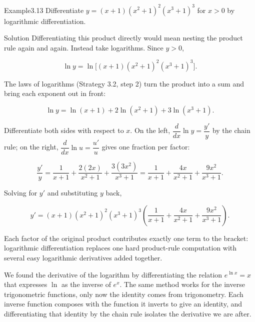 \documentclass[a4paper,12pt,oneside]{memoir}
\begin{document}
\begin{workedexample}
\begin{envexample}{Example}{3.13}{}
Differentiate \(y = (x + 1)(x^{2} + 1)^{2}(x^{3} + 1)^{3}\) for \(x > 0\) by logarithmic differentiation.
\end{envexample}
\begin{envsolution}{Solution}{}{}
Differentiating this product directly would mean nesting the product rule again and again. Instead take logarithms. Since \(y > 0\),

\[ \ln y = \ln\!\bigl[(x + 1)(x^{2} + 1)^{2}(x^{3} + 1)^{3}\bigr]. \]

The laws of logarithms (Strategy 3.2, step 2) turn the product into a sum and bring each exponent out in front:

\[ \ln y = \ln(x + 1) + 2\ln(x^{2} + 1) + 3\ln(x^{3} + 1). \]

Differentiate both sides with respect to \(x\). On the left, \(\dfrac{d}{dx}\ln y = \dfrac{y'}{y}\) by the chain rule; on the right, \(\dfrac{d}{dx}\ln u = \dfrac{u'}{u}\) gives one fraction per factor:

\[ \frac{y'}{y} = \frac{1}{x + 1} + \frac{2(2x)}{x^{2} + 1} + \frac{3(3x^{2})}{x^{3} + 1} = \frac{1}{x + 1} + \frac{4x}{x^{2} + 1} + \frac{9x^{2}}{x^{3} + 1}. \]

Solving for \(y'\) and substituting \(y\) back,

\[ y' = (x + 1)(x^{2} + 1)^{2}(x^{3} + 1)^{3}\left(\frac{1}{x + 1} + \frac{4x}{x^{2} + 1} + \frac{9x^{2}}{x^{3} + 1}\right). \]

Each factor of the original product contributes exactly one term to the bracket: logarithmic differentiation replaces one hard product-rule computation with several easy logarithmic derivatives added together.
\end{envsolution}
\end{workedexample}
We found the derivative of the logarithm by differentiating the relation \(e^{\ln x} = x\) that expresses \(\ln\) as the inverse of \(e^{x}\). The same method works for the inverse trigonometric functions, only now the identity comes from trigonometry. Each inverse function composes with the function it inverts to give an identity, and differentiating that identity by the chain rule isolates the derivative we are after.
\end{document}
